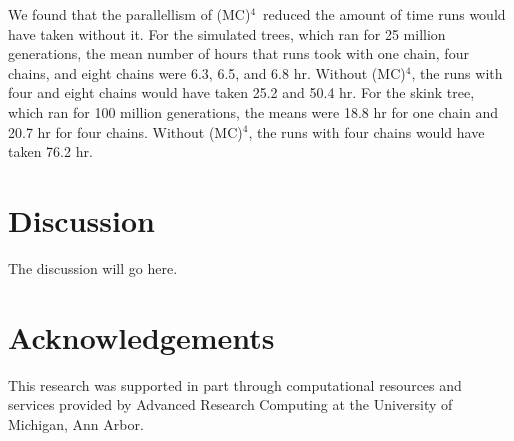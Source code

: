 \documentclass[12pt]{article}
\newcommand{\MCMCMCMC}{(MC)$^{4}$}
\begin{document}
We found that the parallellism of \MCMCMCMC\ 
reduced the amount of time runs would have taken without it.
%
For the simulated trees, which ran for 25 million generations,
the mean number of hours that runs took with
one chain, four chains, and eight chains were
6.3, 6.5, and 6.8 hr.
%
Without \MCMCMCMC, the runs with four and eight chains
would have taken 25.2 and 50.4 hr.
%
For the skink tree, which ran for 100 million generations,
the means were 18.8 hr for one chain
and 20.7 hr for four chains.
%
Without \MCMCMCMC, the runs with four chains would have taken 76.2 hr.


\section*{Discussion}

The discussion will go here.


\section*{Acknowledgements}

This research was supported in part through computational resources
and services provided by Advanced Research Computing
at the University of Michigan, Ann Arbor.



\end{document}
